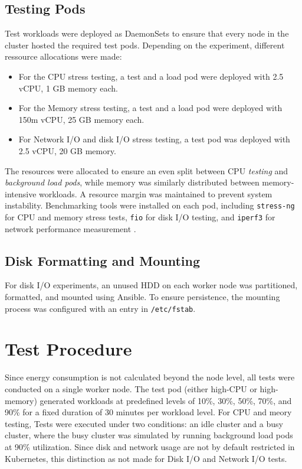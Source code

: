 \subsection{Testing Pods}
Test workloads were deployed as DaemonSets to ensure that every node in the cluster hosted the required test pods. Depending on the experiment, different ressource allocations were made:
\begin{itemize}
    \item For the CPU stress testing, a test and a load pod were deployed with 2.5 vCPU, 1 GB memory each.
    \item For the Memory stress testing, a test and a load pod were deployed with 150m vCPU, 25 GB memory each.
    \item For Network I/O and disk I/O stress testing, a test pod was deployed with 2.5 vCPU, 20 GB memory.
\end{itemize}
The resources were allocated to ensure an even split between CPU \textit{testing} and \textit{background load pods}, while memory was similarly distributed between memory-intensive workloads. A resource margin was maintained to prevent system instability. Benchmarking tools were installed on each pod, including \texttt{stress-ng}\parencite{stress-ng} for CPU and memory stress tests, \texttt{fio}\parencite{fio} for disk I/O testing, and \texttt{iperf3}\parencite{iperf3} for network performance measurement .

\subsection{Disk Formatting and Mounting}
For disk I/O experiments, an unused HDD on each worker node was partitioned, formatted, and mounted using Ansible. To ensure persistence, the mounting process was configured with an entry in \texttt{/etc/fstab}.

\section{Test Procedure}
Since energy consumption is not calculated beyond the node level, all tests were conducted on a single worker node. The test pod (either high-CPU or high-memory) generated workloads at predefined levels of 10\%, 30\%, 50\%, 70\%, and 90\% for a fixed duration of 30 minutes per workload level. For CPU and meory testing, Tests were executed under two conditions: an idle cluster and a busy cluster, where the busy cluster was simulated by running background load pods at 90\% utilization. Since disk and network usage are not by default restricted in Kubernetes, this distinction as not made for Disk I/O and Network I/O tests.

